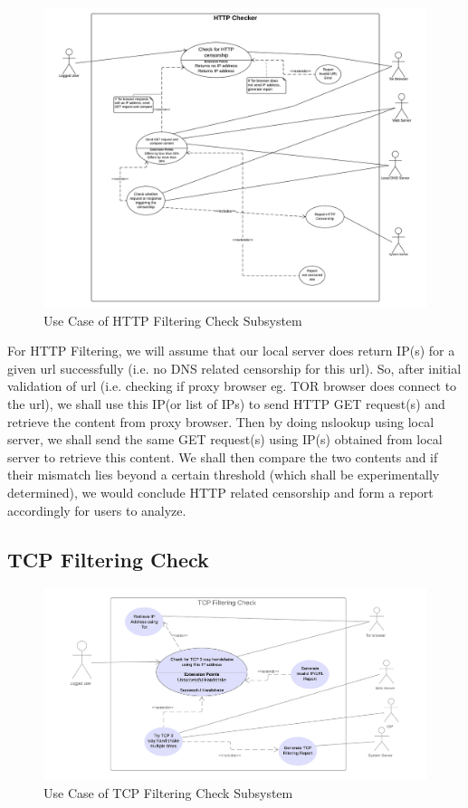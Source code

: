 \documentclass[12pt]{article}
\begin{document}
\begin{figure}[h]
    \centering
    \includegraphics[width=\textwidth]{uchttp.png}
    \caption{Use Case of HTTP Filtering Check Subsystem}
    \label{fig:uchttp}
\end{figure}
For HTTP Filtering, we will assume that our local server does return IP(s) for a given url successfully (i.e. no DNS related censorship for this url). 
So, after initial validation of url (i.e. checking if proxy browser eg. TOR browser does connect to the url), we shall use this IP(or list of IPs) to send HTTP GET request(s) and retrieve the content from proxy browser. Then by doing nslookup using local server, we shall send the same GET request(s) using IP(s) obtained from local server to retrieve this content. We shall then compare the two contents and if their mismatch lies beyond a certain threshold (which shall be experimentally determined), we would conclude HTTP related censorship and form a report accordingly for users to analyze.

\newpage
\subsection{TCP Filtering Check}

\begin{figure}[h]
    \centering
    \includegraphics[width=\textwidth]{uctcp.png}
    \caption{Use Case of TCP Filtering Check Subsystem}
    \label{fig:uctcp}
\end{figure}
\end{document}
